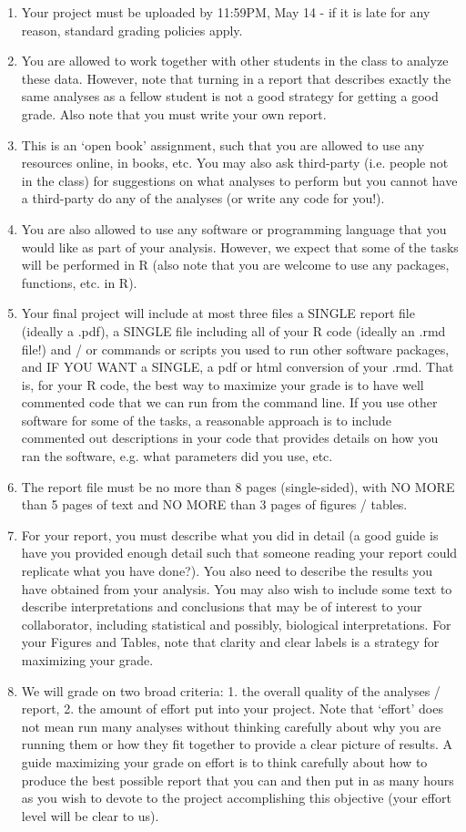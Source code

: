 \documentclass[letterpaper, 11pt]{article}
\begin{document}
\begin{enumerate}
\item Your project must be uploaded by 11:59PM, May 14 - if it is late for any reason, standard grading policies apply.
\item You are allowed to work together with other students in the class to analyze these data.  However, note that turning in a report that describes exactly the same analyses as a fellow student is not a good strategy for getting a good grade.  Also note that you must write your own report.
\item This is an `open book' assignment, such that you are allowed to use any resources online, in books, etc.  You may also ask third-party (i.e. people not in the class) for suggestions on what analyses to perform but you cannot have a third-party do any of the analyses (or write any code for you!).
\item You are also allowed to use any software or programming language that you would like as part of your analysis.  However, we expect that some of the tasks will be performed in R (also note that you are welcome to use any packages, functions, etc. in R).
\item Your final project will include at most three files a SINGLE report file (ideally a .pdf), a SINGLE file including all of your R code (ideally an .rmd file!) and / or commands or scripts you used to run other software packages, and IF YOU WANT a SINGLE, a pdf or html conversion of your .rmd.   That is, for your R code, the best way to maximize your grade is to have well commented code that we can run from the command line.  If you use other software for some of the tasks, a reasonable approach is to include commented out descriptions in your code that provides details on how you ran the software, e.g. what parameters did you use, etc. 
\item The report file must be no more than 8 pages (single-sided), with NO MORE than 5 pages of text and NO MORE than 3 pages of figures / tables.  
\item For your report, you must describe what you did in detail (a good guide is have you provided enough detail such that someone reading your report could replicate what you have done?).  You also need to describe the results you have obtained from your analysis.  You may also wish to include some text to describe interpretations and conclusions that may be of interest to your collaborator, including statistical and possibly, biological interpretations.  For your Figures and Tables, note that clarity and clear labels is a strategy for maximizing your grade.
\item We will grade on two broad criteria: 1. the overall quality of the analyses / report, 2. the amount of effort put into your project.  Note that `effort' does not mean run many analyses without thinking carefully about why you are running them or how they fit together to provide a clear picture of results.  A guide maximizing your grade on effort is to think carefully about how to produce the best possible report that you can and then put in as many hours as you wish to devote to the project accomplishing this objective (your effort level will be clear to us).  
\end{enumerate}
\end{document}
